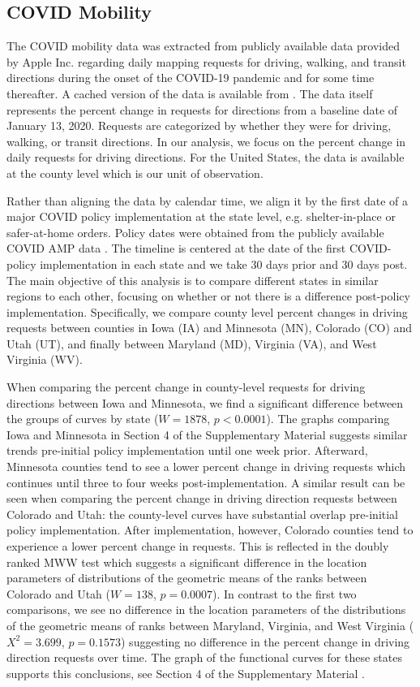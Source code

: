 \documentclass[12pt]{article}
\theoremstyle{plain}
\begin{document}
\subsection{COVID Mobility}

The COVID mobility data was extracted from publicly available data provided by Apple Inc. regarding daily mapping requests for driving, walking, and transit directions during the onset of the COVID-19 pandemic and for some time thereafter. A cached version of the data is available from \cite{Gassen2022}. The data itself represents the percent change in requests for directions from a baseline date of January 13, 2020. Requests are categorized by whether they were for driving, walking, or transit directions. In our analysis, we focus on the percent change in daily requests for driving directions. For the United States, the data is available at the county level which is our unit of observation.

Rather than aligning the data by calendar time, we align it by the first date of a major COVID policy implementation at the state level, e.g. shelter-in-place or safer-at-home orders. Policy dates were obtained from the publicly available COVID AMP data \citep{Katz2023}. The timeline is centered at the date of the first COVID-policy implementation in each state and we take 30 days prior and 30 days post. The main objective of this analysis is to compare different states in similar regions to each other, focusing on whether or not there is a difference post-policy implementation. Specifically, we compare county level percent changes in driving requests between counties in Iowa (IA) and Minnesota (MN), Colorado (CO) and Utah (UT), and finally between Maryland (MD), Virginia (VA), and West Virginia (WV).

When comparing the percent change in county-level requests for driving directions between Iowa and Minnesota, we find a significant difference between the groups of curves by state ($W = 1878$, $p < 0.0001$). The graphs comparing Iowa and Minnesota in Section 4 of the Supplementary Material suggests similar trends pre-initial policy implementation until one week prior. Afterward, Minnesota counties tend to see a lower percent change in driving requests which continues until three to four weeks post-implementation. A similar result can be seen when comparing the percent change in driving direction requests between Colorado and Utah: the county-level curves have substantial overlap pre-initial policy implementation. After implementation, however, Colorado counties tend to experience a lower percent change in requests. This is reflected in the doubly ranked MWW test which suggests a significant difference in the location parameters of distributions of the geometric means of the ranks between Colorado and Utah ($W = 138$, $p = 0.0007$). In contrast to the first two comparisons, we see no difference in the location parameters of the distributions of the geometric means of ranks between Maryland, Virginia, and West Virginia ($X^2 = 3.699$, $p = 0.1573$) suggesting no difference in the percent change in driving direction requests over time. The graph of the functional curves for these states supports this conclusions, see Section 4 of the Supplementary Material \citep{DRTSup2023}.
\end{document}
